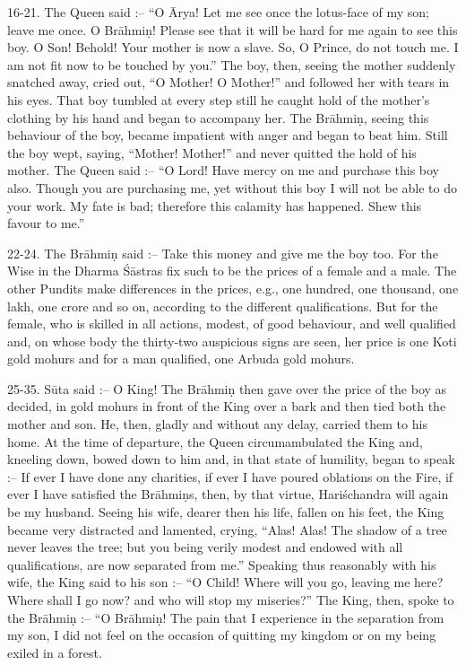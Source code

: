 16-21. The Queen said :-- ``O \=Arya! Let me see once the lotus-face of my son; leave me once. O Br\=ahmi\d{n}! Please see that it will be hard for me again to see this boy. O Son! Behold! Your mother is now a slave. So, O Prince, do not touch me. I am not fit now to be touched by you.'' The boy, then, seeing the mother suddenly snatched away, cried out, ``O Mother! O Mother!'' and followed her with tears in his eyes. That boy tumbled at every step still he caught hold of the mother's clothing by his hand and began to accompany her. The Br\=ahmi\d{n}, seeing this behaviour of the boy, became impatient with anger and began to beat him. Still the boy wept, saying, ``Mother! Mother!'' and never quitted the hold of his mother. The Queen said :-- ``O Lord! Have mercy on me and purchase this boy also. Though you are purchasing me, yet without this boy I will not be able to do your work. My fate is bad; therefore this calamity has happened. Shew this favour to me.''

22-24. The Br\=ahmi\d{n} said :-- Take this money and give me the boy too. For the Wise in the Dharma \'S\=astras fix such to be the prices of a female and a male. The other Pundits make differences in the prices, e.g., one hundred, one thousand, one lakh, one crore and so on, according to the different qualifications. But for the female, who is skilled in all actions, modest, of good behaviour, and well qualified and, on whose body the thirty-two auspicious signs are seen, her price is one Koti gold mohurs and for a man qualified, one Arbuda gold mohurs.

25-35. S\=uta said :-- O King! The Br\=ahmi\d{n} then gave over the price of the boy as decided, in gold mohurs in front of the King over a bark and then tied both the mother and son. He, then, gladly and without any delay, carried them to his home. At the time of departure, the Queen circumambulated the King and, kneeling down, bowed down to him and, in that state of humility, began to speak :-- If ever I have done any charities, if ever I have poured oblations on the Fire, if ever I have satisfied the Br\=ahmi\d{n}s, then, by that virtue, Hari\'schandra will again be my husband. Seeing his wife, dearer then his life, fallen on his feet, the King became very distracted and lamented, crying, ``Alas! Alas! The shadow of a tree never leaves the tree; but you being verily modest and endowed with all qualifications, are now separated from me.'' Speaking thus reasonably with his wife, the King said to his son :-- ``O Child! Where will you go, leaving me here? Where shall I go now? and who will stop my miseries?'' The King, then, spoke to the Br\=ahmi\d{n} :-- ``O Br\=ahmi\d{n}! The pain that I experience in the separation from my son, I did not feel on the occasion of quitting my kingdom or on my being exiled in a forest.

